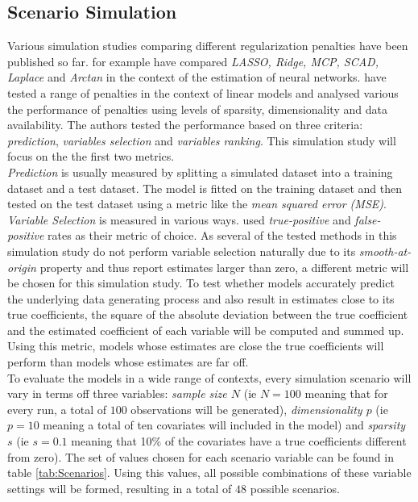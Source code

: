 \documentclass[12pt,a4paper]{article}
\begin{document}
\subsection{Scenario Simulation}
Various simulation studies comparing different regularization penalties have been published so far. \textcite{VettamJohn2022} for example have compared \textit{LASSO, Ridge, MCP, SCAD, Laplace} and \textit{Arctan} in the context of the estimation of neural networks. \textcite{WangEtAl2020} have tested a range of penalties in the context of linear models and analysed various the performance of penalties using levels of sparsity, dimensionality and data availability. The authors tested the performance based on three criteria: \textit{prediction}, \textit{variables selection} and \textit{variables ranking}. This simulation study will focus on the the first two metrics.\\

\textit{Prediction} is usually measured by splitting a simulated dataset into a training dataset and a test dataset. The model is fitted on the training dataset and then tested on the test dataset using a metric like the \textit{mean squared error (MSE)}. \textit{Variable Selection} is measured in various ways. \textcite{WangEtAl2020} used \textit{true-positive} and \textit{false-positive} rates as their metric of choice. As several of the tested methods in this simulation study do not perform variable selection naturally due to its \textit{smooth-at-origin} property and thus report estimates larger than zero, a different metric will be chosen for this simulation study. To test whether models accurately predict the underlying data generating process and also result in estimates close to its true coefficients, the square of the absolute deviation between the true coefficient and the estimated coefficient of each variable will be computed and summed up. Using this metric, models whose estimates are close the true coefficients will perform than models whose estimates are far off.\\

To evaluate the models in a wide range of contexts, every simulation scenario will vary in terms off three variables: \textit{sample size $N$} (ie $N=100$ meaning that for every run, a total of $100$ observations will be generated), \textit{dimensionality $p$} (ie $p=10$ meaning a total of ten covariates will included in the model) and \textit{sparsity $s$} (ie $s=0.1$ meaning that 10\% of the covariates have a true coefficients different from zero). The set of values chosen for each scenario variable can be found in table \ref{tab:Scenarios}. Using this values, all possible combinations of these variable settings will be formed, resulting in a total of $48$ possible scenarios. 
\end{document}
